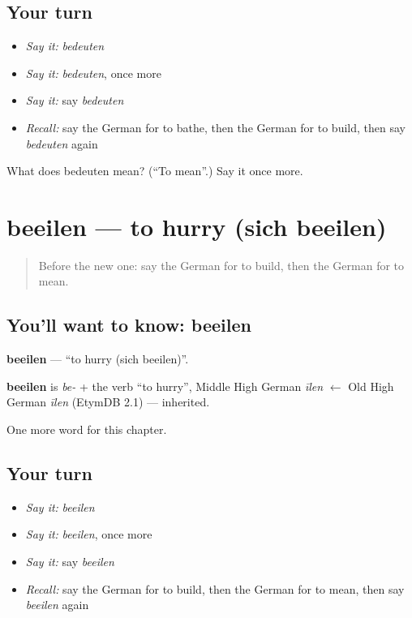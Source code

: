 \subsection*{Your turn}
\begin{itemize}
\raggedright
  \item \emph{Say it:} \emph{bedeuten}
  \item \emph{Say it:} \emph{bedeuten}, once more
  \item \emph{Say it:} say \emph{bedeuten}
  \item \emph{Recall:} say the German for to bathe, then the German for to build, then say \emph{bedeuten} again
\end{itemize}

\begin{tcolorbox}[breakable,colback=teal!4,colframe=teal!35!black,title={Before you move on}]
What does bedeuten mean? (\textquotedblleft{}To mean\textquotedblright{}.) Say it once more.
\end{tcolorbox}
\section[beeilen]{beeilen — to hurry (sich beeilen)}

\label{lesson:GE-C176-beeilen}



\begin{quote}
Before the new one: say the German for to build, then the German for to mean.
\end{quote}

\subsection*{You'll want to know: beeilen}
\textbf{beeilen} — \textquotedblleft{}to hurry (sich beeilen)\textquotedblright{}.

\begin{cousinweb}
\textbf{beeilen} is \emph{be-} + the verb \textquotedblleft{}to hurry\textquotedblright{}, Middle High German \emph{īlen} $\leftarrow$ Old High German \emph{īlen} (EtymDB 2.1) — inherited.
\end{cousinweb}

\begin{grammarlens}[title={What you've built}]
One more word for this chapter.
\end{grammarlens}

\subsection*{Your turn}
\begin{itemize}
\raggedright
  \item \emph{Say it:} \emph{beeilen}
  \item \emph{Say it:} \emph{beeilen}, once more
  \item \emph{Say it:} say \emph{beeilen}
  \item \emph{Recall:} say the German for to build, then the German for to mean, then say \emph{beeilen} again
\end{itemize}

